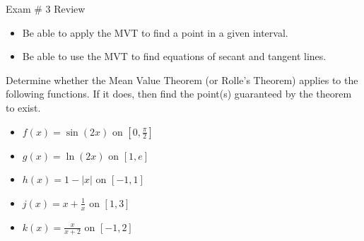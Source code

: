 \documentclass[cal1spr16Lectures.tex]{subfiles}
\begin{document}
\begin{frame}[allowframebreaks]{Exam \# 3 Review}
\begin{itemize}
\begin{itemize}
	\item Be able to apply the MVT to find a point in a given interval.
	\item Be able to use the MVT to find equations of secant and tangent lines.
	\end{itemize}
\begin{exe}[s]
Determine whether the Mean Value Theorem (or Rolle's Theorem) applies to the following functions.  If it does, then find the point(s) guaranteed by the theorem to exist.
	\begin{itemize}\footnotesize
	\item[(1)] $f(x)=\sin{(2x)}$ on $\left[0,\textstyle\frac{\pi}{2}\right]$
	\item[(2)] $g(x)=\ln{(2x)}$ on $\left[1,e\right]$
	\item[(3)] $h(x)=1-\left|x\right|$ on $\left[-1,1\right]$
	\end{itemize}
\end{exe}
\framebreak
\begin{exe}[s] 
	\begin{itemize}\footnotesize
	\item[(4)] $j(x)=x+\textstyle\frac{1}{x}$ on $\left[1,3\right]$
	\item[(5)] $k(x)=\textstyle\frac{x}{x+2}$ on $\left[-1,2\right]$
	\end{itemize}
\end{exe}	
\end{itemize}
\end{frame}
\end{document}

